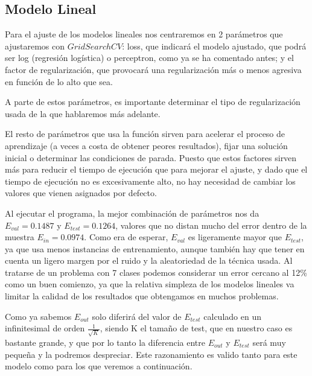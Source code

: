 \documentclass{article}
\begin{document}
	\subsection{Modelo Lineal}
	Para el ajuste de los modelos lineales nos centraremos en 2 parámetros que ajustaremos con $GridSearchCV$: loss, que indicará el modelo ajustado, que podrá ser log (regresión logística) o perceptron, como ya se ha comentado antes; y el factor de regularización, que provocará una regularización más o menos agresiva en función de lo alto que sea.
	\par 
	A parte de estos parámetros, es importante determinar el tipo de regularización usada de la que hablaremos más adelante.
	\par 
	El resto de parámetros que usa la función sirven para acelerar el proceso de aprendizaje (a veces a costa de obtener peores resultados), fijar una solución inicial o determinar las condiciones de parada. Puesto que estos factores sirven más para reducir el tiempo de ejecución que para mejorar el ajuste, y dado que el tiempo de ejecución no es excesivamente alto, no hay necesidad de cambiar los valores que vienen asignados por defecto.
	\par 
	Al ejecutar el programa, la mejor combinación de parámetros nos da  $E_{val} = 0.1487$ y $E_{test} = 0.1264$, valores que no distan mucho del error dentro de la muestra $E_{in} = 0.0974$. Como era de esperar, $E_{val}$ es ligeramente mayor que $E_{test}$, ya que usa menos instancias de entrenamiento, aunque también hay que tener en cuenta un ligero margen por el ruido y la aleatoriedad de la técnica usada. Al tratarse de un problema con 7 clases podemos considerar un error cercano al 12\% como un buen comienzo, ya que la relativa simpleza de los modelos lineales va limitar la calidad de los resultados que obtengamos en muchos problemas.
	  \par 
	Como ya sabemos $E_{out}$ solo diferirá del valor de $E_{test}$ calculado en un infinitesimal de orden $\frac{1}{\sqrt{K}}$, siendo K el tamaño de test, que en nuestro caso es bastante grande, y que por lo tanto la diferencia entre $E_{out}$ y $E_{test}$ será muy pequeña y la podremos despreciar. Este razonamiento es valido tanto para este modelo como para los que veremos a continuación.
	
\end{document}
